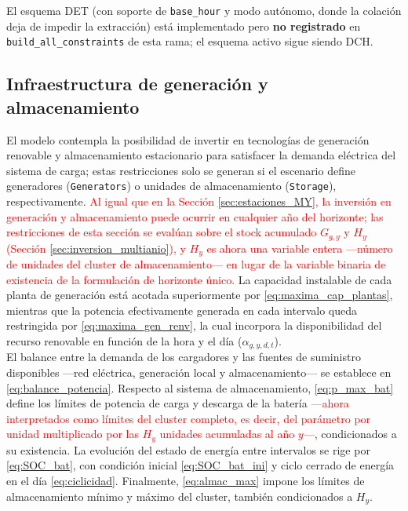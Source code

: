 \documentclass[11pt]{article}
\newcommand{\change}[1]{\textcolor{red}{#1}}
\begin{document}
\noindent El esquema DET (con soporte de \texttt{base\_hour} y modo autónomo, donde la colación deja de impedir la extracción) está implementado pero \textbf{no registrado} en \texttt{build\_all\_constraints} de esta rama; el esquema activo sigue siendo DCH.

\subsection{Infraestructura de generación y almacenamiento}
\label{sec:generacion_MY}

El modelo contempla la posibilidad de invertir en tecnologías de generación renovable y almacenamiento estacionario para satisfacer la demanda eléctrica del sistema de carga; estas restricciones solo se generan si el escenario define generadores (\texttt{Generators}) o unidades de almacenamiento (\texttt{Storage}), respectivamente. \change{Al igual que en la Sección \ref{sec:estaciones_MY}, la inversión en generación y almacenamiento puede ocurrir en cualquier año del horizonte; las restricciones de esta sección se evalúan sobre el stock acumulado $G_{g,y}$ y $H_y$ (Sección \ref{sec:inversion_multianio}), y $H_y$ es ahora una variable entera —número de unidades del cluster de almacenamiento— en lugar de la variable binaria de existencia de la formulación de horizonte único.} La capacidad instalable de cada planta de generación está acotada superiormente por \eqref{eq:maxima_cap_plantas}, mientras que la potencia efectivamente generada en cada intervalo queda restringida por \eqref{eq:maxima_gen_renv}, la cual incorpora la disponibilidad del recurso renovable en función de la hora y el día ($\alpha_{g,y,d,t}$).\\

El balance entre la demanda de los cargadores y las fuentes de suministro disponibles —red eléctrica, generación local y almacenamiento— se establece en \eqref{eq:balance_potencia}. Respecto al sistema de almacenamiento, \eqref{eq:p_max_bat} define los límites de potencia de carga y descarga de la batería \change{—ahora interpretados como límites del cluster completo, es decir, del parámetro por unidad multiplicado por las $H_y$ unidades acumuladas al año $y$—}, condicionados a su existencia. La evolución del estado de energía entre intervalos se rige por \eqref{eq:SOC_bat}, con condición inicial \eqref{eq:SOC_bat_ini} y ciclo cerrado de energía en el día \eqref{eq:ciclicidad}. Finalmente, \eqref{eq:almac_max} impone los límites de almacenamiento mínimo y máximo del cluster, también condicionados a $H_y$.
\end{document}
